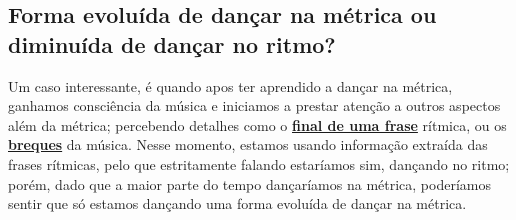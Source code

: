 \subsection{Forma evoluída de dançar na métrica ou diminuída de dançar no ritmo?}
Um caso interessante, é quando apos ter aprendido a dançar na métrica,
ganhamos consciência da música e iniciamos a prestar atenção a outros aspectos além da métrica;
percebendo detalhes como o \hyperref[sec:perceberfrases]{\textbf{final de uma frase}} rítmica, 
ou os \hyperref[sec:percepcionbreak]{\textbf{breques}} da  música.
Nesse momento, estamos usando informação extraída das frases rítmicas, 
pelo que estritamente falando estaríamos sim,  dançando no ritmo; 
porém, dado que a maior parte do tempo dançaríamos na métrica,
 poderíamos sentir que só estamos dançando uma forma evoluída de dançar na métrica.

